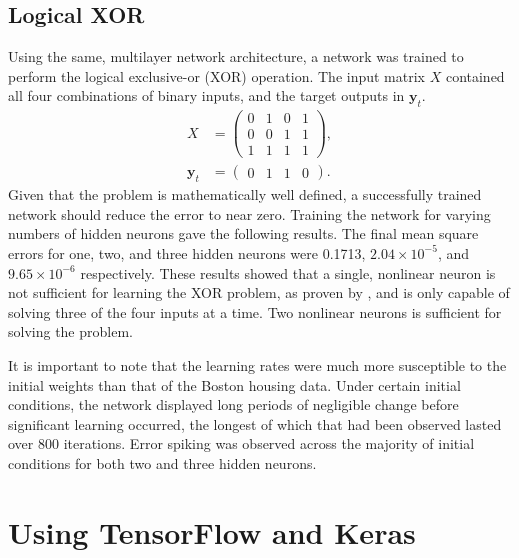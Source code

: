 \subsection{Logical XOR}

Using the same, multilayer network architecture, a network was trained to
perform the logical exclusive-or (XOR) operation.
The input matrix $X$ contained all four combinations of binary inputs, and the
target outputs in $\mathbf{y}_t$.
\begin{align*}
    X &= \begin{pmatrix}
        0 & 1 & 0 & 1 \\
        0 & 0 & 1 & 1 \\
        1 & 1 & 1 & 1
    \end{pmatrix},\\
    \mathbf{y}_t &= \begin{pmatrix}
        0 & 1 & 1 & 0
    \end{pmatrix}.
\end{align*}
Given that the problem is mathematically well defined, a successfully trained
network should reduce the error to near zero.
Training the network for varying numbers of hidden neurons gave the following
results.
The final mean square errors for one, two, and three hidden neurons were 0.1713,
$2.04\times10^{-5}$, and $9.65\times10^{-6}$ respectively.
These results showed that a single, nonlinear neuron is not sufficient for
learning the XOR problem, as proven by \cite{Minsky:1969:Perceptrons}, and is
only capable of solving three of the four inputs at a time.
Two nonlinear neurons is sufficient for solving the problem.

It is important to note that the learning rates were much more susceptible to
the initial weights than that of the Boston housing data.
Under certain initial conditions, the network displayed long periods of
negligible change before significant learning occurred, the longest of which
that had been observed lasted over 800 iterations.
Error spiking was observed across the majority of initial conditions for both
two and three hidden neurons.



\section{Using TensorFlow and Keras}

